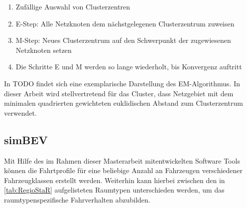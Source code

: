 \begin{enumerate}
	\item Zufällige Auswahl von Clusterzentren
	\item E-Step: Alle Netzknoten dem nächstgelegenen Clusterzentrum zuweisen
	\item M-Step: Neues Clusterzentrum auf den Schwerpunkt der zugewiesenen Netzknoten setzen
	\item Die Schritte E und M werden so lange wiederholt, bis Konvergenz auftritt
\end{enumerate}


In {\color{red} TODO} findet sich eine exemplarische Darstellung des EM-Algorithmus.
In dieser Arbeit wird stellvertretend für das Cluster, dass Netzgebiet mit dem minimalen quadrierten gewichteten euklidischen Abstand zum Clusterzentrum verwendet.


\subsection{simBEV}\label{chap:simbev_theo}


Mit Hilfe des im Rahmen dieser Masterarbeit mitentwickelten Software Tools \simbev können die Fahrtprofile für eine beliebige Anzahl an Fahrzeugen verschiedener Fahrzeugklassen erstellt werden.
Weiterhin kann hierbei zwischen den in \autoref{tab:RegioStaR} aufgelisteten \Regiostar Raumtypen unterschieden werden, um das raumtypenspezifische Fahrverhalten abzubilden.



